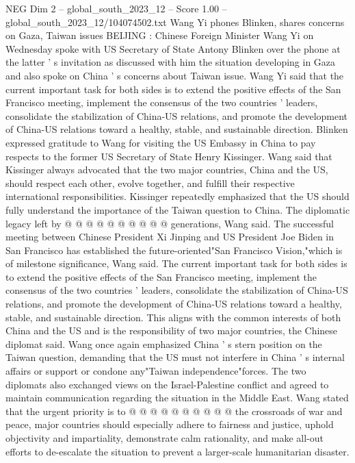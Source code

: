 \begin{textsample}{NEG Dim 2 – global\_south\_2023\_12 – Score 1.00 – global\_south\_2023\_12/104074502.txt}  \label{ex:f2_neg_423}
Wang Yi phones Blinken, shares concerns on Gaza, Taiwan issues BEIJING : Chinese Foreign Minister Wang Yi on Wednesday spoke with US Secretary of State Antony Blinken over the phone at the latter ' s invitation as discussed with him the situation developing in Gaza and also spoke on China ' s concerns about Taiwan issue.
Wang Yi said that the current important task for both sides is to extend the positive effects of the San Francisco meeting, implement the consensus of the two countries ' leaders, consolidate the stabilization of China-US relations, and promote the development of China-US relations toward a healthy, stable, and sustainable direction.
Blinken expressed gratitude to Wang for visiting the US Embassy in China to pay respects to the former US Secretary of State Henry Kissinger.
Wang said that Kissinger always advocated that the two major countries, China and the US, should respect each other, evolve together, and fulfill their respective international responsibilities.
Kissinger repeatedly emphasized that the US should fully understand the importance of the Taiwan question to China.
The diplomatic legacy left by @ @ @ @ @ @ @ @ @ @ generations, Wang said.
The successful meeting between Chinese President Xi Jinping and US President Joe Biden in San Francisco has established the future-oriented"San Francisco Vision,"which is of milestone significance, Wang said.
The current important task for both sides is to extend the positive effects of the San Francisco meeting, implement the consensus of the two countries ' leaders, consolidate the stabilization of China-US relations, and promote the development of China-US relations toward a healthy, stable, and sustainable direction.
This aligns with the common interests of both China and the US and is the responsibility of two major countries, the Chinese diplomat said.
Wang once again emphasized China ' s stern position on the Taiwan question, demanding that the US must not interfere in China ' s internal affairs or support or condone any"Taiwan independence"forces.
The two diplomats also exchanged views on the Israel-Palestine conflict and agreed to maintain communication regarding the situation in the Middle East.
Wang stated that the urgent priority is to @ @ @ @ @ @ @ @ @ @ the crossroads of war and peace, major countries should especially adhere to fairness and justice, uphold objectivity and impartiality, demonstrate calm rationality, and make all-out efforts to de-escalate the situation to prevent a larger-scale humanitarian disaster.

\end{textsample}
